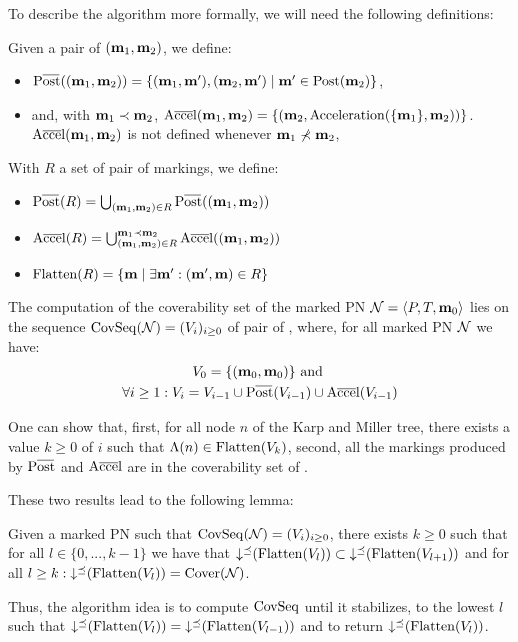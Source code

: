 To describe the algorithm more formally, we will need the following definitions:

Given a pair of \omarks $(\mathbf{m}_1, \mathbf{m}_2)$, we define:
\begin{itemize}
  \item $\Postb((\mar_1, \mar_2)) = \{(\mar_1, \marp), (\mar_2, \marp) \mid \marp \in \Post(\mar_2)\}$,
  \item and, with $\mathbf{m}_1 \prec \mathbf{m}_2$, $\operatorname{A\overline{cce}l}(\mathbf{m}_1, \mathbf{m}_2) = \{(\mathbf{m}_2, \operatorname{Acceleration}(\{\mathbf{m}_1\}, \mathbf{m}_2))\}$.
    $\operatorname{A\overline{cce}l}(\mathbf{m}_1, \mathbf{m}_2)$ is not defined whenever $\mathbf{m}_1 \nprec \mathbf{m}_2$,
\end{itemize}

With $R$ a set of pair of markings, we define:
\begin{itemize}
  \item $\Postb(R) = \bigcup_{(\mar_1, \mar_2) \in R} \Postb((\mar_1, \mar_2))$
  \item $\operatorname{A\overline{cce}l}(R) = \bigcup_{(\mathbf{m}_1, \mathbf{m}_2) \in R}^{\mathbf{m}_1 \prec \mathbf{m}_2} \operatorname{A\overline{cce}l}((\mathbf{m}_1, \mathbf{m}_2))$
  \item $\operatorname{Flatten}(R) = \{\mathbf{m} \mid \exists \mathbf{m'} : (\mathbf{m'}, \mathbf{m}) \in R\}$
\end{itemize}

The computation of the coverability set of the marked \ac{PN} $\mathcal{N} = \langle P,T, \mathbf{m}_0\rangle$ lies on the sequence $\operatorname{CovSeq}(\mathcal{N}) = (V_i)_{i \geq 0}$ of pair of \omarks, where, for all marked \ac{PN} $\mathcal{N}$ we have:
\begin{gather*}
  V_0 = \{(\mari, \mari)\} \text{ and } \\
  \forall i \geq 1 : V_i = V_{i-1} \cup \Postb(V_{i-1}) \cup \Accelb(V_{i-1})
\end{gather*}

One can show that,
first, for all node $n$ of the Karp and Miller tree, there exists a value $k \geq 0$ of $i$ such that $\Lambda(n) \in \operatorname{Flatten}(V_k)$,
second, all the markings produced by $\Postb$ and $\operatorname{A\overline{cce}l}$ are in the coverability set of \N.

These two results lead to the following lemma:
\begin{lemm}
  Given a marked \ac{PN} \N such that $\operatorname{CovSeq}(\mathcal{N}) = (V_i)_{i \geq 0}$,
  there exists $k \geq 0$ such that for all $l \in \{0, ..., k-1\}$ we have that $\operatorname{\downarrow^\preceq}(\operatorname{Flatten}(V_l)) \subset \operatorname{\downarrow^\preceq}(\operatorname{Flatten}(V_{l+1}))$
  and for all $l \geq k : \operatorname{\downarrow^\preceq}(\operatorname{Flatten}(V_l)) = \operatorname{Cover}(\mathcal{N})$.
\end{lemm}

Thus, the algorithm idea is to compute $\operatorname{CovSeq}$ until it stabilizes,  to the lowest $l$ such that $\operatorname{\downarrow^\preceq}(\operatorname{Flatten}(V_l)) = \operatorname{\downarrow^\preceq}(\operatorname{Flatten}(V_{l-1}))$ and to return $\operatorname{\downarrow^\preceq}(\operatorname{Flatten}(V_l))$.

